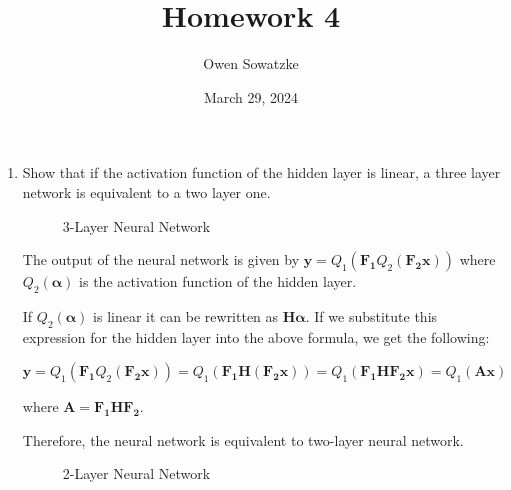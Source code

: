 \documentclass[fleqn]{article}
\title{Homework 4}
\author{Owen Sowatzke}
\date{March 29, 2024}
\newcommand{\zerodisplayskip}{
	\setlength{\abovedisplayskip}{0pt}%
	\setlength{\belowdisplayskip}{0pt}%
	\setlength{\abovedisplayshortskip}{0pt}%
	\setlength{\belowdisplayshortskip}{0pt}%
	\setlength{\mathindent}{0pt}}
\begin{document}
	\offinterlineskip
	\setlength{\lineskip}{12pt}
	\zerodisplayskip
	\maketitle
	
	\begin{enumerate}
		\item Show that if the activation function of the hidden layer is linear, a three layer network is equivalent to a two layer one.
		
		\begin{figure}[H]
			\centerline{}
			\caption{3-Layer Neural Network}
			\label{neural_network_3_layer}
		\end{figure}
	
		The output of the neural network is given by $\mathbf{y} = Q_1(\mathbf{F_1}Q_2(\mathbf{F_2}\mathbf{x}))$ where $Q_2(\boldsymbol{\alpha})$ is the activation function of the hidden layer.
		
		If $Q_2(\boldsymbol{\alpha})$ is linear it can be rewritten as $\mathbf{H}\boldsymbol{\alpha}$. If we substitute this expression for the hidden layer into the above formula, we get the following:
		
		$\mathbf{y} = Q_1(\mathbf{F_1}Q_2(\mathbf{F_2}\mathbf{x})) = Q_1(\mathbf{F_1H(F_2\mathbf{x})}) = Q_1(\mathbf{F_1HF_2x}) = Q_1(\mathbf{Ax})$
		
		where $\mathbf{A} = \mathbf{F_1HF_2}$.
		
		Therefore, the neural network is equivalent to two-layer neural network.
		
		\begin{figure}[H]
			\centerline{}
			\caption{2-Layer Neural Network}
			\label{neural_network_2_layer}
		\end{figure}
		

\end{enumerate}
\end{document}
